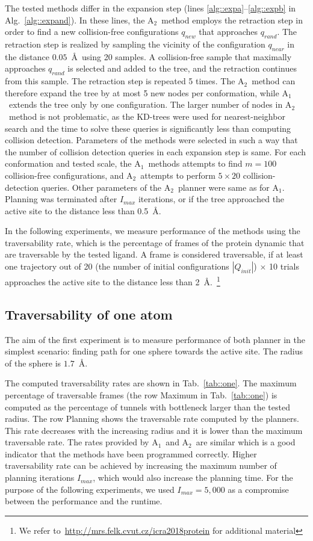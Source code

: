 \documentclass[usletter, 10pt, conference]{ieeeconf} %
\def\qrand{q_{rand}}
\def\qnear{q_{near}}
\def\qnew{q_{new}}
\def\QI{Q_{init}}
\def\Imax{I_{max}} %
\def\RA{A$_{1}$}
\def\RB{A$_{2}$}
\begin{document}
The tested methods differ in the expansion step (lines \ref{alg::expa}--\ref{alg::expb} in Alg.~\ref{alg::expand}).
In these lines, the \RB\ method employs the retraction step in order to find a new collision-free configurations $\qnew$ that approaches $\qrand$.
The retraction step is realized by sampling the vicinity of the configuration $\qnear$ in the distance $0.05$~\AA\ using 20 samples.
A collision-free sample that maximally approaches $\qrand$ is selected and added to the tree, and the retraction continues from this sample.
The retraction step is repeated 5 times.
The \RB\ method can therefore expand the tree by at most 5 new nodes per conformation, while \RA\ extends the tree only by one configuration.
The larger number of nodes in \RB\ method is not problematic, as the KD-trees were used for nearest-neighbor search and the time to solve these queries is significantly less than computing collision detection.
Parameters of the methods were selected in such a way that the number of collision detection queries in each expansion step is same.
For each conformation and tested scale, the \RA\ methods attempts to find $m=100$ collision-free configurations, and \RB\ attempts to perform $5 \times 20$ collision-detection queries.
Other parameters of the \RB\ planner were same as for \RA.
Planning was terminated after $\Imax$ iterations, or if the tree approached the active site to the distance less than 0.5~\AA.

In the following experiments, we measure performance of the methods using the traversability rate, which is the percentage of frames of the protein dynamic that are traversable by the tested ligand.
A frame is considered traversable, if at least one trajectory out of 20 (the number of initial configurations $|\QI|$) $\times$ 10 trials approaches the active site to the distance less than 2~\AA.~\footnote{We refer to~\url{http://mrs.felk.cvut.cz/icra2018protein} for additional material}

\subsection{Traversability of one atom}

The aim of the first experiment is to measure performance of both planner in the simplest scenario: finding path for one sphere towards the active site.
The radius of the sphere is $1.7$~\AA. 

The computed traversability rates are shown in Tab.~\ref{tab::one}.
The maximum percentage of traversable frames (the row Maximum in Tab.~\ref{tab::one}) is computed as the percentage of tunnels with bottleneck larger than the tested radius.
The row Planning shows the traversable rate computed by the planners.
This rate decreases with the increasing radius and it is lower than the maximum traversable rate.
The rates provided by \RA\ and \RB\ are similar which is a good indicator that the methods have been programmed correctly.
Higher traversability rate can be achieved by increasing the maximum number of planning iterations $\Imax$, which would also
increase the planning time.
For the purpose of the following experiments, we used $\Imax=5,000$ as a compromise between the performance and the runtime.
\end{document}

